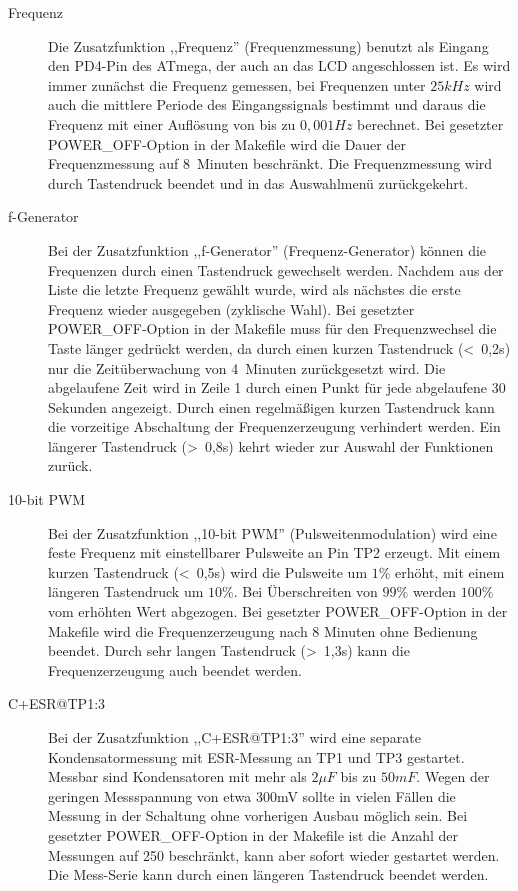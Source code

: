 \begin{description}
 \item[Frequenz]
Die Zusatzfunktion ,,Frequenz'' (Frequenzmessung) benutzt als Eingang den PD4-Pin des ATmega, der auch an das LCD angeschlossen ist.
Es wird immer zunächst die Frequenz gemessen, bei Frequenzen unter \(25kHz\) wird auch die mittlere Periode des Eingangssignals
bestimmt und daraus die Frequenz mit einer Auflösung von bis zu \(0,001Hz\) berechnet.
Bei gesetzter POWER\_OFF-Option in der Makefile wird die Dauer der Frequenzmessung auf 8~Minuten beschränkt.
Die Frequenzmessung wird durch Tastendruck beendet und in das Auswahlmenü zurückgekehrt.\\

 \item[f-Generator]
Bei der Zusatzfunktion ,,f-Generator'' (Frequenz-Generator) können die Frequenzen durch einen Tastendruck 
 gewechselt werden.
Nachdem aus der Liste die letzte Frequenz gewählt wurde, wird als nächstes die erste Frequenz
 wieder ausgegeben (zyklische Wahl).
Bei gesetzter POWER\_OFF-Option in der Makefile muss für den Frequenzwechsel die Taste länger gedrückt werden, da
durch einen kurzen Tastendruck (\textless~0,2s) nur die Zeitüberwachung von 4~Minuten zurückgesetzt wird.
Die abgelaufene Zeit wird in Zeile 1 durch einen Punkt für jede abgelaufene 30 Sekunden angezeigt.
Durch einen regelmäßigen kurzen Tastendruck kann die vorzeitige Abschaltung der Frequenzerzeugung verhindert werden.
Ein längerer Tastendruck (\textgreater~0,8s) kehrt wieder zur Auswahl der Funktionen zurück.\\

 \item[10-bit PWM]
Bei der Zusatzfunktion ,,10-bit PWM'' (Pulsweitenmodulation) wird eine feste Frequenz mit einstellbarer Pulsweite an Pin TP2 erzeugt.
Mit einem kurzen Tastendruck (\textless~0,5s) wird die Pulsweite um \(1\%\) erhöht, mit einem längeren Tastendruck um \(10\%\).
Bei Überschreiten von \(99\%\) werden \(100\%\) vom erhöhten Wert abgezogen.
Bei gesetzter POWER\_OFF-Option in der Makefile wird die Frequenzerzeugung nach 8 Minuten ohne Bedienung beendet.
Durch sehr langen Tastendruck (\textgreater~1,3s) kann die Frequenzerzeugung auch beendet werden.\\

 \item[C+ESR@TP1:3]
Bei der Zusatzfunktion ,,C+ESR@TP1:3'' wird eine separate Kondensatormessung mit ESR-Messung an TP1 und TP3 gestartet.
Messbar sind Kondensatoren mit mehr als \(2\mu F\) bis zu \(50mF\). Wegen der geringen Messspannung von etwa 300mV sollte
in vielen Fällen die Messung in der Schaltung ohne vorherigen Ausbau möglich sein.
Bei gesetzter POWER\_OFF-Option in der Makefile ist die Anzahl der Messungen auf 250 beschränkt,
kann aber sofort wieder gestartet werden.
Die Mess-Serie kann durch einen längeren Tastendruck beendet werden.\\


\end{description}
